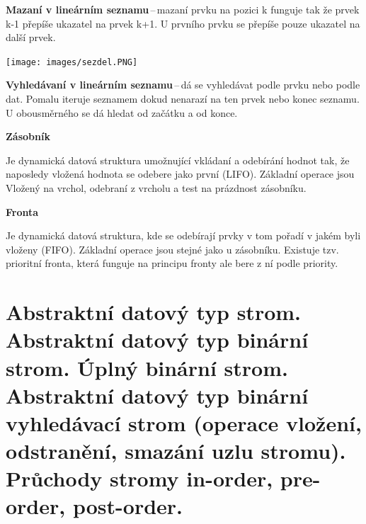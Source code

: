 \textbf{Mazaní v lineárním seznamu}\,--\,mazaní prvku na pozici k funguje tak že prvek k-1 přepíše ukazatel na prvek k+1. U prvního prvku se přepíše pouze ukazatel na další prvek.
\begin{center}
\texttt{[image: images/sezdel.PNG]}
\end{center}

\textbf{Vyhledávaní v lineárním seznamu}\,--\,dá se vyhledávat podle prvku nebo podle dat. Pomalu iteruje seznamem dokud nenarazí na ten prvek nebo konec seznamu. U obousměrného se dá hledat od začátku a od konce.

\begin{Large}\vspace{0,5cm} \textbf{Zásobník}
\end{Large}

Je dynamická datová struktura umožnující vkládaní a odebírání hodnot tak, že naposledy vložená hodnota se odebere jako první (LIFO). Základní operace jsou Vložený na vrchol, odebraní z vrcholu a test na prázdnost zásobníku. 

\begin{Large}\vspace{0,5cm} \textbf{Fronta}
\end{Large}

Je dynamická datová struktura, kde se odebírají prvky v tom pořadí v jakém byli vloženy (FIFO). Základní operace jsou stejné jako u zásobníku. Existuje tzv. prioritní fronta, která funguje na principu fronty ale bere z ní podle priority.








\newpage
\section{Abstraktní datový typ strom. Abstraktní datový typ binární strom. Úplný binární strom. Abstraktní datový typ binární vyhledávací strom (operace vložení, odstranění, smazání uzlu stromu). Průchody stromy in-order, pre-order, post-order.}

